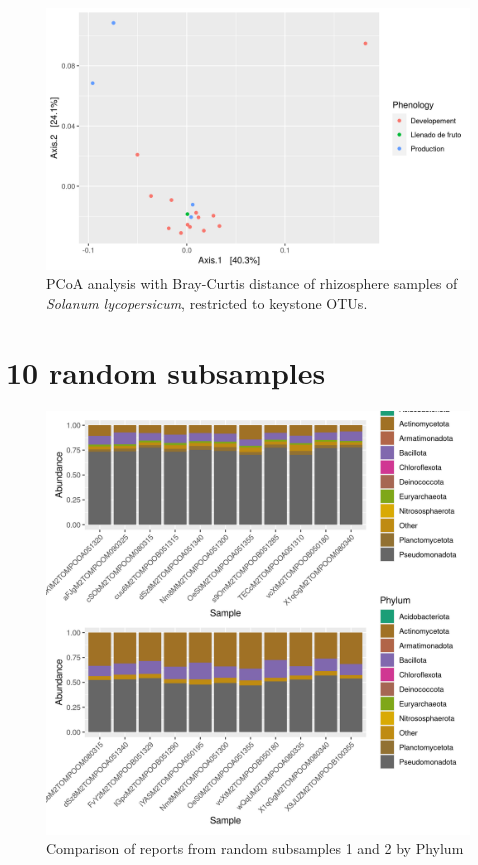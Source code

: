 \documentclass{article}
\begin{document}
\begin{figure}
    \centering
    \includegraphics[scale = 0.7]{tomate_clave_pcoa.png}
    \caption{PCoA analysis with Bray-Curtis distance of rhizosphere samples of \textit{Solanum lycopersicum}, restricted to keystone OTUs.}
    \label{fig:tomate_pcoa_key_otus}
\end{figure}


\section{10 random subsamples}

\begin{figure}
\centering
\includegraphics[scale=0.8]{otus_centrales_tomate_aleatorio1_1.csv_otus_centrales_tomate_aleatorio1_2.csv_relative_abundance_Phylum.png}
\caption{Comparison of reports from random subsamples 1 and 2 by Phylum}
\end{figure}
\end{document}
